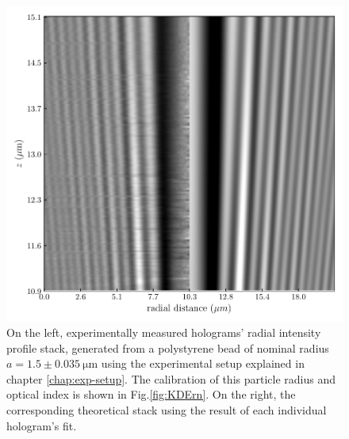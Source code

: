 \begin{figure}
	\centering
	\includegraphics{02_body/chapter2/images/test_tableau2.pdf}
	\caption{On the left, experimentally measured  holograms' radial intensity profile stack, generated from a polystyrene bead of nominal radius $a = 1.5 \pm 0.035 ~ \mathrm{\mu m} $ using the experimental setup explained in chapter \ref{chap:exp-setup}. The calibration of this particle radius and optical index is shown in Fig.\ref{fig:KDErn}. On the right, the corresponding theoretical stack using the result of each individual hologram's fit.}
	\label{fig:holo_z_fit}
\end{figure}



